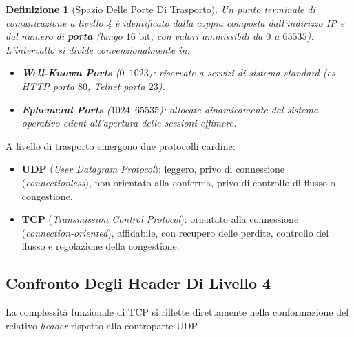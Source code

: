 \documentclass[11pt, a4paper]{article}
\newtheorem{theorem}{Definizione}
\begin{document}
\begin{theorem}[Spazio Delle Porte Di Trasporto]
Un punto terminale di comunicazione a livello 4 è identificato dalla coppia composta dall'indirizzo IP e dal numero di \textbf{porta} (lungo $16\text{ bit}$, con valori ammissibili da $0$ a $65535$). L'intervallo si divide convenzionalmente in:
\begin{itemize}[noitemsep]
    \item \textbf{Well-Known Ports} ($0$--$1023$): riservate a servizi di sistema standard (es. HTTP porta $80$, Telnet porta $23$).
    \item \textbf{Ephemeral Ports} ($1024$--$65535$): allocate dinamicamente dal sistema operativo client all'apertura delle sessioni effimere.
\end{itemize}
\end{theorem}


A livello di trasporto emergono due protocolli cardine:
\begin{itemize}[noitemsep]
    \item \textbf{UDP} (\emph{User Datagram Protocol}): leggero, privo di connessione (\emph{connectionless}), non orientato alla conferma, privo di controllo di flusso o congestione.
    \item \textbf{TCP} (\emph{Transmission Control Protocol}): orientato alla connessione (\emph{connection-oriented}), affidabile, con recupero delle perdite, controllo del flusso e regolazione della congestione.
\end{itemize}

\subsection{Confronto Degli Header Di Livello 4}

La complessità funzionale di TCP si riflette direttamente nella conformazione del relativo \emph{header} rispetto alla controparte UDP.

\end{document}
